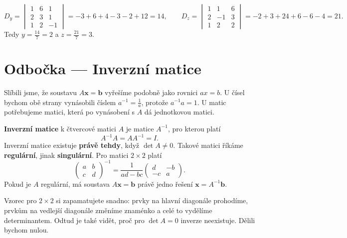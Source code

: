 \begin{solution}
  \begin{equation*}
    D_y = \begin{vmatrix} 1 & 6 & 1\\ 2 & 3 & 1\\ 1 & 2 & -1 \end{vmatrix} = -3 + 6 + 4 - 3 - 2 + 12 = 14,\qquad
    D_z = \begin{vmatrix} 1 & 1 & 6\\ 2 & -1 & 3\\ 1 & 2 & 2 \end{vmatrix} = -2 + 3 + 24 + 6 - 6 - 4 = 21.
  \end{equation*}
  Tedy $y = \frac{14}{7} = 2$ a $z = \frac{21}{7} = 3$.
\end{solution}

\section{Odbočka --- Inverzní matice}\label{sec:inverzni-matice}

Slíbili jsme, že soustavu $A\mathbf{x} = \mathbf{b}$ vyřešíme podobně jako rovnici $ax = b$. U čísel bychom obě strany vynásobili číslem $a^{-1} = \frac{1}{a}$, protože $a^{-1}a = 1$. U matic potřebujeme matici, která po vynásobení s $A$ dá jednotkovou matici.

\begin{definitionbox}
  \textbf{Inverzní matice} k čtvercové matici $A$ je matice $A^{-1}$, pro kterou platí
  \begin{equation*}
    A^{-1}A = AA^{-1} = I.
  \end{equation*}
  Inverzní matice existuje \textbf{právě tehdy}, když $\det A\neq 0$. Takové matici říkáme \textbf{regulární}, jinak \textbf{singulární}. Pro matici $2\times 2$ platí
  \begin{equation*}
    \begin{pmatrix} a & b\\ c & d \end{pmatrix}^{-1} = \frac{1}{ad - bc}\begin{pmatrix} d & -b\\ -c & a \end{pmatrix}.
  \end{equation*}
  Pokud je $A$ regulární, má soustava $A\mathbf{x} = \mathbf{b}$ právě jedno řešení $\mathbf{x} = A^{-1}\mathbf{b}$.
\end{definitionbox}

Vzorec pro $2\times 2$ si zapamatujete snadno: prvky na hlavní diagonále prohodíme, prvkům na vedlejší diagonále změníme znaménko a celé to vydělíme determinantem. Odtud je také vidět, proč pro $\det A = 0$ inverze neexistuje. Dělili bychom nulou.

